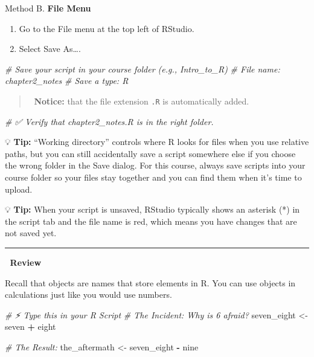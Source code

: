 \documentclass[
  12pt,
]{scrreprt}
\newenvironment{Shaded}{\begin{snugshade}}{\end{snugshade}}
\newcommand{\CommentTok}[1]{\textcolor[rgb]{0.56,0.35,0.01}{\textit{#1}}}
\newcommand{\NormalTok}[1]{#1}
\newcommand{\OtherTok}[1]{\textcolor[rgb]{0.56,0.35,0.01}{#1}}
\newcommand{\SpecialCharTok}[1]{\textcolor[rgb]{0.81,0.36,0.00}{\textbf{#1}}}
\begin{document}
Method B. \textbf{File Menu}

\begin{enumerate}
\def\labelenumi{\arabic{enumi}.}
\item
  Go to the File menu at the top left of RStudio.
\item
  Select Save As\ldots.
\end{enumerate}

\begin{Shaded}
\begin{Highlighting}[]
\CommentTok{\# Save your script in your course folder (e.g., Intro\_to\_R)}
\CommentTok{\# File name: chapter2\_notes}
\CommentTok{\# Save a type: R}
\end{Highlighting}
\end{Shaded}

\begin{quote}
🧐 \textbf{Notice:} that the file extension \texttt{.R} is automatically
added.
\end{quote}

\begin{Shaded}
\begin{Highlighting}[]
\CommentTok{\# ✅ Verify that \textasciigrave{}chapter2\_notes.R\textasciigrave{} is in the right folder.}
\end{Highlighting}
\end{Shaded}

💡 \textbf{Tip:} ``Working directory'' controls where R looks for files
when you use relative paths, but you can still accidentally save a
script somewhere else if you choose the wrong folder in the Save dialog.
For this course, always save scripts into your course folder so your
files stay together and you can find them when it's time to upload.

💡 \textbf{Tip:} When your script is unsaved, RStudio typically shows an
asterisk (*) in the script tab and the file name is red, which means you
have changes that are not saved yet.

\begin{center}\rule{0.5\linewidth}{0.5pt}\end{center}

📖 \textbf{Review}

Recall that objects are names that store elements in R. You can use
objects in calculations just like you would use numbers.

\begin{Shaded}
\begin{Highlighting}[]
\CommentTok{\# ⚡ Type this in your R Script}
\CommentTok{\# The Incident: Why is 6 afraid?}
\NormalTok{seven\_eight }\OtherTok{\textless{}{-}}\NormalTok{ seven }\SpecialCharTok{+}\NormalTok{ eight}

\CommentTok{\# The Result:}
\NormalTok{the\_aftermath }\OtherTok{\textless{}{-}}\NormalTok{ seven\_eight }\SpecialCharTok{{-}}\NormalTok{ nine}
\end{Highlighting}
\end{Shaded}
\end{document}
